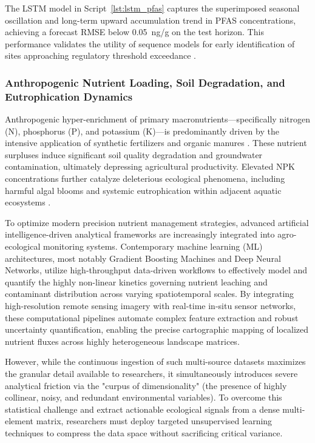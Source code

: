 \documentclass[environments,article,submit,pdftex,moreauthors]{Definitions/mdpi}
\begin{document}
The LSTM model in Script~\ref{lst:lstm_pfas} captures the superimposed
seasonal oscillation and long-term upward accumulation trend in PFAS
concentrations, achieving a forecast RMSE below 0.05~ng/g on the test
horizon. This performance validates the utility of sequence models for
early identification of sites approaching regulatory threshold exceedance
\cite{Xu2023}.

\subsubsection{Anthropogenic Nutrient Loading, Soil Degradation, and
    Eutrophication Dynamics}\label{sec2.1.5}

Anthropogenic hyper-enrichment of primary macronutrients---specifically
nitrogen (N), phosphorus (P), and potassium (K)---is predominantly driven by
the intensive application of synthetic fertilizers and organic manures
\cite{Baghaie2020,Luo2017,Hepperly2009}. These nutrient surpluses induce
significant soil quality degradation and groundwater contamination, ultimately
depressing agricultural productivity. Elevated NPK concentrations further
catalyze deleterious ecological phenomena, including harmful algal blooms and
systemic eutrophication within adjacent aquatic ecosystems
\cite{Guan2024,Xu2025}.

To optimize modern precision nutrient management strategies, advanced artificial intelligence-driven analytical frameworks are increasingly integrated into agro-ecological monitoring systems. Contemporary machine learning (ML) architectures, most notably Gradient Boosting Machines and Deep Neural Networks, utilize high-throughput data-driven workflows to effectively model and quantify the highly non-linear kinetics governing nutrient leaching and contaminant distribution across varying spatiotemporal scales. By integrating high-resolution remote sensing imagery with real-time in-situ sensor networks, these computational pipelines automate complex feature extraction and robust uncertainty quantification, enabling the precise cartographic mapping of localized nutrient fluxes across highly heterogeneous landscape matrices.

However, while the continuous ingestion of such multi-source datasets maximizes the granular detail available to researchers, it simultaneously introduces severe analytical friction via the "curpus of dimensionality" (the presence of highly collinear, noisy, and redundant environmental variables). To overcome this statistical challenge and extract actionable ecological signals from a dense multi-element matrix, researchers must deploy targeted unsupervised learning techniques to compress the data space without sacrificing critical variance.
\end{document}
